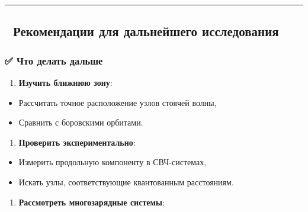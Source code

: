 \documentclass[11pt]{article}
\providecommand{\tightlist}{%
      \setlength{\itemsep}{0pt}\setlength{\parskip}{0pt}}
\begin{document}
\begin{center}\rule{0.5\linewidth}{\linethickness}\end{center}

\subsection{🎯 Рекомендации для дальнейшего
исследования}\label{ux440ux435ux43aux43eux43cux435ux43dux434ux430ux446ux438ux438-ux434ux43bux44f-ux434ux430ux43bux44cux43dux435ux439ux448ux435ux433ux43e-ux438ux441ux441ux43bux435ux434ux43eux432ux430ux43dux438ux44f-1}

\subsubsection{✅ Что делать
дальше}\label{ux447ux442ux43e-ux434ux435ux43bux430ux442ux44c-ux434ux430ux43bux44cux448ux435}

\begin{enumerate}
\def\labelenumi{\arabic{enumi}.}
\tightlist
\item
  \textbf{Изучить ближнюю зону}:\\
\end{enumerate}

\begin{itemize}
\tightlist
\item
  Рассчитать точное расположение узлов стоячей волны,\\
\item
  Сравнить с боровскими орбитами.
\end{itemize}

\begin{enumerate}
\def\labelenumi{\arabic{enumi}.}
\setcounter{enumi}{1}
\tightlist
\item
  \textbf{Проверить экспериментально}:\\
\end{enumerate}

\begin{itemize}
\tightlist
\item
  Измерить продольную компоненту в СВЧ-системах,\\
\item
  Искать узлы, соответствующие квантованным расстояниям.
\end{itemize}

\begin{enumerate}
\def\labelenumi{\arabic{enumi}.}
\setcounter{enumi}{2}
\tightlist
\item
  \textbf{Рассмотреть многозарядные системы}:\\
\end{enumerate}
\end{document}
